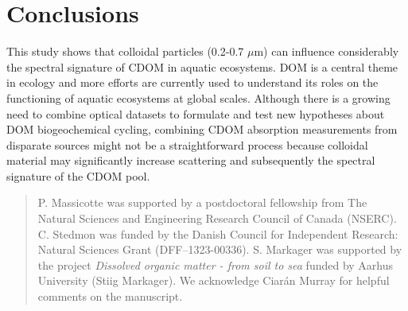
\section*{Conclusions}
\label{sec:Conclusions}

This study shows that colloidal particles (0.2-0.7 $\mu$m) can influence considerably the spectral signature of CDOM in aquatic ecosystems. DOM is a central theme in ecology and more efforts are currently used to understand its roles on the functioning of aquatic ecosystems at global scales. Although there is a growing need to combine optical datasets to formulate and test new hypotheses about DOM biogeochemical cycling, combining CDOM absorption measurements from disparate sources might not be a straightforward process because colloidal material may significantly increase scattering and subsequently the spectral signature of the CDOM pool.

\renewcommand{\abstractname}{Acknowledgements}
\begin{abstract}
	P. Massicotte was supported by a postdoctoral fellowship from The Natural Sciences and Engineering Research Council of Canada (NSERC). C. Stedmon was funded by the Danish Council for Independent Research: Natural Sciences Grant (DFF–1323-00336). S. Markager was supported by the project \textit{Dissolved organic matter - from soil to sea} funded by Aarhus University (Stiig Markager). We acknowledge Ciar\'{a}n Murray for helpful comments on the manuscript. 
\end{abstract}
